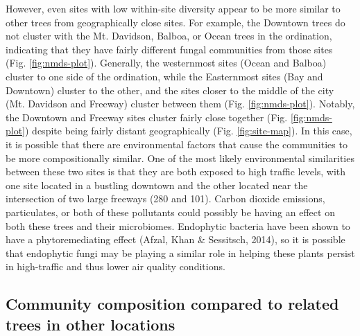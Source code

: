 \documentclass[fleqn,10pt,lineno]{wlpeerj} %
\begin{document}
However, even sites with low within-site diversity appear to be more similar to other trees from geographically close sites. For example, the Downtown trees do not cluster with the Mt. Davidson, Balboa, or Ocean trees in the ordination, indicating that they have fairly different fungal communities from those sites (Fig. \ref{fig:nmds-plot}). Generally, the westernmost sites (Ocean and Balboa) cluster to one side of the ordination, while the Easternmost sites (Bay and Downtown) cluster to the other, and the sites closer to the middle of the city (Mt. Davidson and Freeway) cluster between them (Fig. \ref{fig:nmds-plot}). Notably, the Downtown and Freeway sites cluster fairly close together (Fig. \ref{fig:nmds-plot}) despite being fairly distant geographically (Fig. \ref{fig:site-map}). In this case, it is possible that there are environmental factors that cause the communities to be more compositionally similar. One of the most likely environmental similarities between these two sites is that they are both exposed to high traffic levels, with one site located in a bustling downtown and the other located near the intersection of two large freeways (280 and 101). Carbon dioxide emissions, particulates, or both of these pollutants could possibly be having an effect on both these trees and their microbiomes. Endophytic bacteria have been shown to have a phytoremediating effect (Afzal, Khan \& Sessitsch, 2014), so it is possible that endophytic fungi may be playing a similar role in helping these plants persist in high-traffic and thus lower air quality conditions.

\hypertarget{community-composition-compared-to-related-trees-in-other-locations}{%
\subsection*{Community composition compared to related trees in other locations}\label{community-composition-compared-to-related-trees-in-other-locations}}
\end{document}
